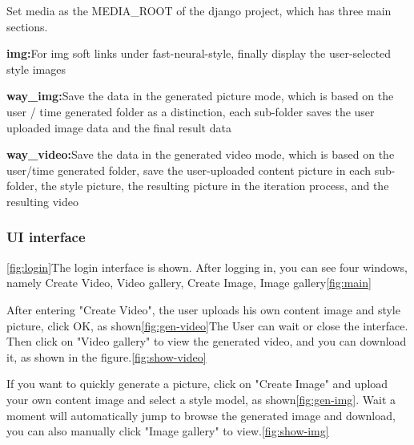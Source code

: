 Set media as the MEDIA\_ROOT of the django project, which has three main sections.
\begin{description}
  \item{\textbf{img:}}For img soft links under fast-neural-style, finally display the user-selected style images
  \item{\textbf{way\_img:}}Save the data in the generated picture mode, which is based on the user / time generated folder as a distinction, each sub-folder saves the user uploaded image data and the final result data
  \item{\textbf{way\_video:}}Save the data in the generated video mode, which is based on the user/time generated folder, save the user-uploaded content picture in each sub-folder, the style picture, the resulting picture in the iteration process, and the resulting video
\end{description}

\subsubsection{UI interface}
\ref{fig:login}The login interface is shown. After logging in, you can see four windows, namely Create Video, Video gallery, Create Image, Image gallery\ref{fig:main}

After entering "Create Video", the user uploads his own content image and style picture, click OK, as shown\ref{fig:gen-video}The User can wait or close the interface.
Then click on "Video gallery" to view the generated video, and you can download it, as shown in the figure.\ref{fig:show-video}

If you want to quickly generate a picture, click on "Create Image" and upload your own content image and select a style model, as shown\ref{fig:gen-img}.
Wait a moment will automatically jump to browse the generated image and download, you can also manually click "Image gallery" to view.\ref{fig:show-img}
